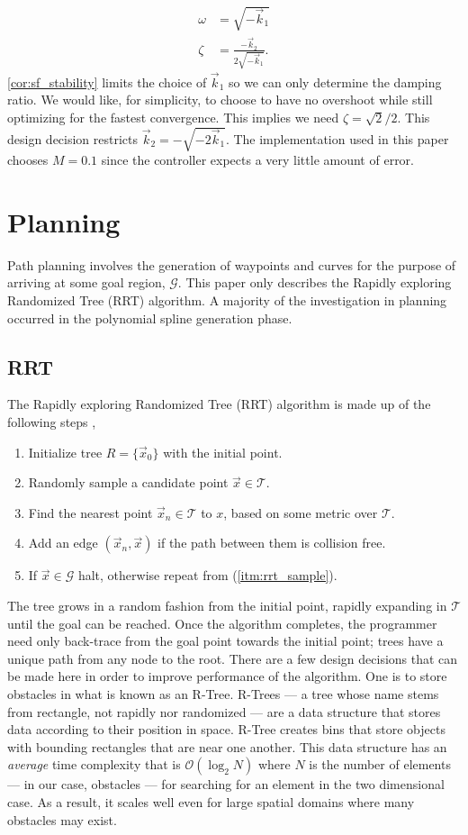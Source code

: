 \begin{align*}
    \omega &= \sqrt{-\vec{k}_1}\\
    \zeta &= \frac{-\vec{k}_2}{2 \sqrt{-\vec{k}_1}}.
\end{align*}
\eqref{cor:sf_stability} limits the choice of $\vec{k}_1$ so we can only determine the damping ratio. We would like, for simplicity, to choose to have no overshoot while still optimizing for the fastest convergence. This implies we need $\zeta = \sqrt{2}/2$. This design decision restricts $\vec{k}_2 = -\sqrt{-2\vec{k}_1}$. The implementation used in this paper chooses $M=0.1$ since the controller expects a very little amount of error.

\chapter{Planning}\label{sec:planning}
Path planning involves the generation of waypoints and curves for the purpose of arriving at some goal region, $\mathcal{G}$. This paper only describes the Rapidly exploring Randomized Tree (RRT) algorithm. A majority of the investigation in planning occurred in the polynomial spline generation phase.

\section{RRT}
The Rapidly exploring Randomized Tree (RRT) algorithm is made up of the following steps \cite{Karaman11},
\begin{enumerate}
    \item Initialize tree $R=\{ \vec{x}_0 \}$ with the initial point.
    \item Randomly sample a candidate point $\vec{x} \in \mathcal{T}$.\label{itm:rrt_sample}
    \item Find the nearest point $\vec{x}_n\in \mathcal{T}$ to $x$, based on some metric over $\mathcal{T}$.
    \item Add an edge $(\vec{x}_n, \vec{x})$ if the path between them is collision free.
    \item If $\vec{x}\in\mathcal{G}$ halt, otherwise repeat from (\ref{itm:rrt_sample}).
\end{enumerate}
The tree grows in a random fashion from the initial point, rapidly expanding in $\mathcal{T}$ until the goal can be reached. Once the algorithm completes, the programmer need only back-trace from the goal point towards the initial point; trees have a unique path from any node to the root. There are a few design decisions that can be made here in order to improve performance of the algorithm. One is to store obstacles in what is known as an R-Tree. R-Trees --- a tree whose name stems from rectangle, not rapidly nor randomized --- are a data structure that stores data according to their position in space. R-Tree creates bins that store objects with  bounding rectangles that are near one another. This data structure has an \emph{average} time complexity that is $\mathcal{O}(\log_2 N)$ where $N$ is the number of elements --- in our case, obstacles --- for searching for an element in the two dimensional case. As a result, it scales well even for large spatial domains where many obstacles may exist.

